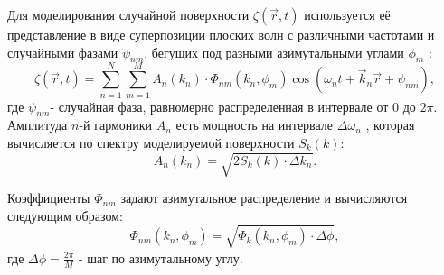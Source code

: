 Для моделирования случайной поверхности $\zeta(\vec r,t)$ используется её представление в виде суперпозиции плоских волн с различными частотами и случайными фазами $\psi_{nm}$, бегущих под разными азимутальными углами $\phi_m$ \cite{Longe}:
\begin{equation}
	\zeta(\vec r, t)= \sum\limits_{n=1}^N \sum_{m=1}^M A_n(k_n)\cdot 
		\Phi_{nm}(k_n, \phi_m) \cos(\omega_n t + \vec k_n \vec r + \psi_{nm}),
\end{equation}
где $\psi_{nm}$- случайная фаза, равномерно распределенная в интервале от 0 до $2\pi$. Амплитуда $n$-й гармоники $A_n$ есть мощность на интервале $\Delta \omega_n$ , которая вычисляется по спектру моделируемой поверхности $S_k(k)$:
\begin{equation}
 	A_n(k_n)=\sqrt{2S_k(k) \cdot \Delta k_n}.
 \end{equation} 

 Коэффициенты $\Phi_{nm}$ задают азимутальное распределение и вычисляются следующим образом:
 \begin{equation}
 	\Phi_{nm}(k_n, \phi_m)= \sqrt{\Phi_k(k_n,\phi_m)\cdot \Delta \phi},
 \end{equation}
 где $\Delta \phi=\frac{2 \pi}{M}$ - шаг по азимутальному углу.

